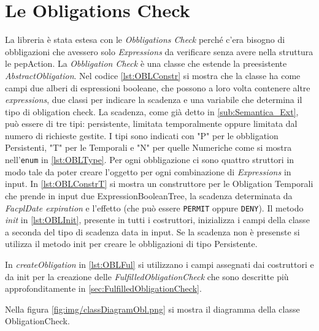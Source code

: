 \section{Le Obligations Check}
\label{sec:Le Obligations Check}
La libreria è stata estesa con le \emph{Obbligations Check} perché c'era bisogno di obbligazioni che avessero solo
\emph{Expressions} da verificare senza avere nella struttura le pepAction.
La \emph{Obbligation Check} è una classe che estende la preesistente \emph{AbstractObligation}.
Nel codice \ref{lst:OBLConstr} si mostra che la classe ha come campi due alberi di espressioni booleane, che possono
a loro volta contenere altre \emph{expressions}, due classi per indicare la scadenza e una variabile che determina
il tipo di obligation check.
La scadenza, come già detto in \ref{sub:Semantica_Ext}, può essere di tre tipi: persistente,
limitata temporalmente oppure limitata dal numero di richieste gestite. I tipi sono indicati con "P" per le obbligation Persistenti,
"T" per le Temporali e "N" per quelle Numeriche come si mostra nell'\texttt{enum} in \ref{lst:OBLType}.
Per ogni obbligazione ci sono quattro struttori in modo tale da poter creare l'oggetto per ogni combinazione di \emph{Expressions}
in input. In \ref{lst:OBLConstrT} si mostra un construttore per le Obligation Temporali che prende in input due ExpressionBooleanTree,
la scadenza determinata da \emph{FacplDate expiration} e l'effetto (che può essere \texttt{PERMIT} oppure \texttt{DENY}).
Il metodo \emph{init} in \ref{lst:OBLInit}, presente in tutti i costruttori, inizializza i campi della classe a seconda del tipo di scadenza data
in input. Se la scadenza non è presenste si utilizza il metodo init per creare le obbligazioni di tipo Persistente.

In \emph{createObligation} in \ref{lst:OBLFul} si utilizzano i campi assegnati dai costruttori
e da init per la creazione delle \emph{FulfilledObligationCheck}
che sono descritte più approfonditamente in \ref{sec:FulfilledObligationCheck}.

Nella figura \ref{fig:img/classDiagramObl.png} si mostra il diagramma della classe ObligationCheck.
\newpage

